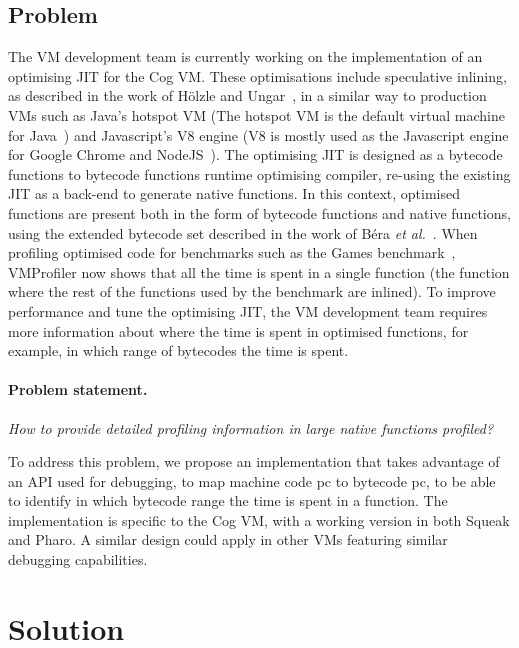 \documentclass[10pt,nonatbib]{sigplanconf}
\newcommand{\etal}{\emph{et al.}\xspace}
\begin{document}
\subsection{Problem}

The VM development team is currently working on the implementation of an optimising JIT for the Cog VM. These optimisations include speculative inlining, as described in the work of H\"olzle and Ungar~\cite{Holz94a}, in a similar way to production VMs such as Java's hotspot VM (The hotspot VM is the default virtual machine for Java~\cite{Pale01a}) and Javascript's V8 engine (V8 is mostly used as the Javascript engine for Google Chrome and NodeJS~\cite{V8}). The optimising JIT is designed as a bytecode functions to bytecode functions runtime optimising compiler, re-using the existing JIT as a back-end to generate native functions. In this context, optimised functions are present both in the form of bytecode functions and native functions, using the extended bytecode set described in the work of B\'era \etal~\cite{Bera14a}. When profiling optimised code for benchmarks such as the Games benchmark~\cite{GameBenchs}, VMProfiler now shows that all the time is spent in a single function (the function where the rest of the functions used by the benchmark are inlined). To improve performance and tune the optimising JIT, the VM development team requires more information about where the time is spent in optimised functions, for example, in which range of bytecodes the time is spent.

\vspace{0.2cm}
\paragraph{Problem statement.} \emph{How to provide detailed profiling information in large native functions profiled?}
\vspace{0.2cm}

To address this problem, we propose an implementation that takes advantage of an API used for debugging, to map machine code pc to bytecode pc, to be able to identify in which bytecode range the time is spent in a function. The implementation is specific to the Cog VM, with a working version in both Squeak and Pharo. A similar design could apply in other VMs featuring similar debugging capabilities.


\section{Solution}
\end{document}
